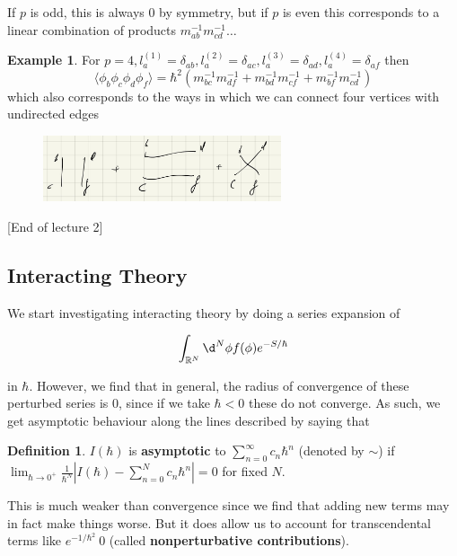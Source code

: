 \documentclass{article}
\theoremstyle{definition}
\newtheorem{definition}{Definition}
\newtheorem{example}{Example}
\begin{document}
If $p$ is odd, this is always 0 by symmetry, but if $p$ is even this corresponds
to a linear combination of products $m_{ab}^{-1} m_{cd}^{-1} \dots$

\begin{example}
  For $p=4, l^{(1)}_a = \delta_{ab}, l^{(2)}_a = \delta_{ac}, l^{(3)}_a =
  \delta_{ad}, l^{(4)}_a = \delta_{af}$ then
  \begin{equation}
    \langle \phi_b \phi_c \phi_d \phi_f \rangle = \hbar^2 (m_{bc}^{-1} m_{df}^{-1} + m_{bd}^{-1} m_{cf}^{-1} +
    m_{bf}^{-1} m_{cd}^{-1})
  \end{equation}
  which also corresponds to the ways in which we can connect four vertices with
  undirected edges
  \begin{figure}[H]
    \centering
    \includegraphics[width=7cm]{res/AQFT/connecting_four_vertices}
    \label{connecting_four_vertices}
  \end{figure}
\end{example}

[End of lecture 2]

\subsection{Interacting Theory}

We start investigating interacting theory by doing a series expansion of

\begin{equation}
  \int_{\mathbb{R}^N} \d^N \phi f(\phi) e^{-S / \hbar}
\end{equation}

in $\hbar$. However, we find that in general, the radius of convergence of these
perturbed series is 0, since if we take $\hbar < 0$ these do not converge. As
such, we get asymptotic behaviour along the lines described by saying that

\begin{definition}
  $I(\hbar)$ is \textbf{asymptotic} to $\sum_{n = 0}^\infty c_n \hbar^n$
  (denoted by $\sim$) if $\lim_{\hbar \to 0^+} \frac{1}{\hbar^N} | I(\hbar) -
  \sum_{n = 0}^N c_n \hbar^n | = 0$ for fixed $N$.
\end{definition}

This is much weaker than convergence since we find that adding new terms may in
fact make things worse. But it does allow us to account for transcendental terms
like $e^{-1 / \hbar^2} ~ 0$ (called \textbf{nonperturbative contributions}).
\end{document}
